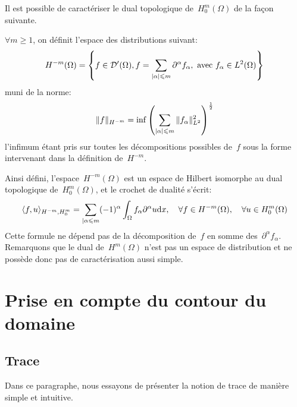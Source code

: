\medskip
\begin{definition}\label{Th-Hmm}
Il est possible de caractériser le dual topologique de~$H^m_0(\Omega)$ de la façon suivante.

$\forall m\ge 1$, on définit l'espace des distributions suivant:
\begin{equation}
H^{-m}(\Omega) =\left\{
f\in \mathcal{D}'(\Omega), f=\displaystyle\sum_{|\alpha|\leqslant m} \partial^\alpha f_\alpha,
\text{ avec } f_\alpha\in L^2(\Omega)
\right\}
\end{equation}
muni de la norme:
\begin{equation}
\|f\|_{H^{-m}} = \inf \left( \displaystyle\sum_{|\alpha|\leqslant m} \|f_\alpha\|^2_{L^2} \right)^{1\over2}
\end{equation}
l'infimum étant pris sur toutes les décompositions possibles de~$f$ sous la forme intervenant dans la définition de~$H^{-m}$.
\end{definition}
\medskipvm
Ainsi défini, l'espace~$H^{-m}(\Omega)$ est un espace de Hilbert isomorphe au dual topologique de~$H^m_0(\Omega)$, et le crochet de dualité s'écrit:
\begin{equation}
\langle f,u\rangle_{H^{-m},H_0^m} = \displaystyle\sum_{|\alpha\leqslant m} (-1)^\alpha \displaystyle\int_\Omega
f_\alpha \partial^\alpha u \text{d} x,
\quad \forall f\in H^{-m}(\Omega),\quad \forall u\in H^m_0(\Omega)
\end{equation}
Cette formule ne dépend pas de la décomposition de~$f$ en somme des~$\partial^\alpha f_\alpha$.
\medskipvm
Remarquons que le dual de~$H^m(\Omega)$ n'est pas un espace de distribution et ne possède donc pas de caractérisation aussi simple.

\medskip
\section{Prise en compte du contour du domaine}

\subsection{Trace}
Dans ce paragraphe, nous essayons de présenter la notion de trace de manière simple et intuitive.

